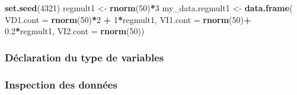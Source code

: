 \documentclass[
]{book}
\newenvironment{Shaded}{\begin{snugshade}}{\end{snugshade}}
\newcommand{\DataTypeTok}[1]{\textcolor[rgb]{0.13,0.29,0.53}{#1}}
\newcommand{\DecValTok}[1]{\textcolor[rgb]{0.00,0.00,0.81}{#1}}
\newcommand{\FloatTok}[1]{\textcolor[rgb]{0.00,0.00,0.81}{#1}}
\newcommand{\KeywordTok}[1]{\textcolor[rgb]{0.13,0.29,0.53}{\textbf{#1}}}
\newcommand{\NormalTok}[1]{#1}
\newcommand{\OperatorTok}[1]{\textcolor[rgb]{0.81,0.36,0.00}{\textbf{#1}}}
\newcommand{\StringTok}[1]{\textcolor[rgb]{0.31,0.60,0.02}{#1}}
\begin{document}
\begin{Shaded}
\begin{Highlighting}[]
\KeywordTok{set.seed}\NormalTok{(}\DecValTok{4321}\NormalTok{)}
\NormalTok{regmult1 <-}\StringTok{ }\KeywordTok{rnorm}\NormalTok{(}\DecValTok{50}\NormalTok{)}\OperatorTok{*}\DecValTok{3}
\NormalTok{my_data.regmult1 <-}\StringTok{ }\KeywordTok{data.frame}\NormalTok{(}
  \DataTypeTok{VD1.cont =} \KeywordTok{rnorm}\NormalTok{(}\DecValTok{50}\NormalTok{)}\OperatorTok{*}\DecValTok{2} \OperatorTok{+}\StringTok{ }\DecValTok{1}\OperatorTok{*}\NormalTok{regmult1,}
  \DataTypeTok{VI1.cont =} \KeywordTok{rnorm}\NormalTok{(}\DecValTok{50}\NormalTok{)}\OperatorTok{+}\StringTok{ }\FloatTok{0.2}\OperatorTok{*}\NormalTok{regmult1,}
  \DataTypeTok{VI2.cont =} \KeywordTok{rnorm}\NormalTok{(}\DecValTok{50}\NormalTok{))}
\end{Highlighting}
\end{Shaded}

\hypertarget{duxe9claration-du-type-de-variables-3}{%
\subsubsection{Déclaration du type de variables}\label{duxe9claration-du-type-de-variables-3}}

\begin{Shaded}
\end{Shaded}

\hypertarget{inspection-des-donnuxe9es-3}{%
\subsubsection{Inspection des données}\label{inspection-des-donnuxe9es-3}}
\end{document}
